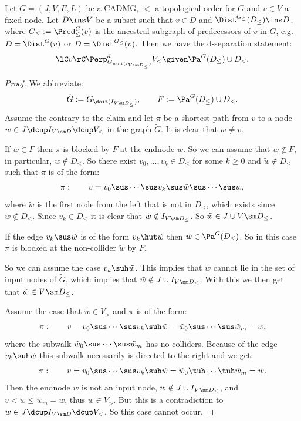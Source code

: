 \begin{Lem}
    \label{lem:id-d-sep-3}
   Let $G=(J,V,E,L)$ be a CADMG, $<$ a topological order for $G$ and $v \in V$ a fixed node.
   Let $D \ins V$ be a subset such that $v \in D$ and $\Dist^{G_\le}(D_\le)\ins D$,
   where $G_\le:=\Pred^G_\le(v)$ is the ancestral subgraph of predecessors of $v$ in $G$, e.g.\ $D=\Dist^G(v)$ or $D=\Dist^{G_\le}(v)$.
   Then we have the d-separation statement:
   \[ \lC v \rC \Perp^d_{G_{\doit( I_{V\sm D_\le} )}}  V_< \given \Pa^G(D_\le) \cup D_<.  \]
   \begin{proof}
       We abbreviate:
       \[\tilde G := G_{\doit( I_{V\sm D_\le} )}, \qquad F:= \Pa^G(D_\le) \cup D_<.\]
       Assume the contrary to the claim and let $\pi$ be a shortest path from $v$ to a node $w \in J \dcup I_{V \sm D} \dcup V_<$ in the graph $\tilde G$. It is clear that $w \neq v$.

       If $w \in F$ then $\pi$ is blocked by $F$ at the endnode $w$.
       So we can assume that $w \notin F$, in particular, $w \notin D_\le$.
       So there exist $v_0,\dots,v_k \in D_\le$ for some $k\ge 0$ and $\tilde w \notin D_\le$ such that $\pi$ is of the form:
       \[\pi:\qquad v=v_0 \sus \cdots \sus v_k \sus \tilde w \sus \cdots  \sus w, \]
       where $\tilde w$ is the first node from the left that is not in $D_\le$, which exists since $w \notin D_\le$. 
       Since $v_k \in D_\le$ it is clear that $\tilde w \notin I_{V\sm D_\le}$. %
       So $\tilde w \in J \cup V \sm D_\le$. 
      
       If the edge $v_k \sus \tilde w$ is of the form $v_k \hut \tilde w$ then $\tilde w \in \Pa^G(D_\le)$. 
       So in this case $\pi$ is blocked at the non-collider $\tilde w$ by $F$.

       So we can assume the case $v_k \suh \tilde w$. This implies that $\tilde w$ cannot lie in the set of input nodes of $\tilde G$, 
       which implies that $\tilde w \notin J \cup I_{V\sm D_\le}$. With this we then get that $\tilde w \in V \sm D_\le$. 

       Assume the case that $\tilde w \in V_>$ and $\pi$ is of the form:
        \[\pi:\qquad v=v_0 \sus \cdots \sus v_k \suh \tilde w = \tilde w_0 \sus  \cdots  \sus \tilde w_m =w, \]
       where the subwalk $\tilde w_0 \sus  \cdots  \sus \tilde w_m$ has no colliders. 
       Because of the edge $v_k \suh \tilde w$ this subwalk necessarily is directed to the right and we get:
        \[\pi:\qquad v=v_0 \sus \cdots \sus v_k \suh \tilde w = \tilde w_0 \tuh  \cdots  \tuh \tilde w_m =w. \]
       Then the endnode $w$ is not an input node, $w \notin J \cup I_{V\sm D_\le}$, and $v < \tilde w \le \tilde w_m= w$, thus $w \in V_>$. 
       But this is a contradiction to $w \in J \dcup I_{V \sm D} \dcup V_<$. So this case cannot occur.


\end{proof}
\end{Lem}
